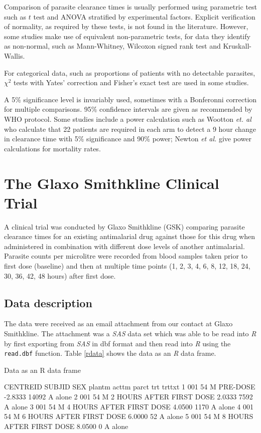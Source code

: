 Comparison of parasite clearance times is usually performed using parametric test such as $t$ test and ANOVA stratified by experimental factors\cite{vries, smithuis, wootton, carmello}. Explicit verification of normality, as required by these tests, is not found in the literature. However, some studies make use of equivalent non-parametric tests, for data they identify as non-normal, such as Mann-Whitney, Wilcoxon signed rank test\cite{carmello, newton} and Kruskall-Wallis\cite{pukri}.\label{stat-tests}

For categorical data, such as proportions of patients with no detectable parasites, $\chi^{2}$ tests with Yates' correction and Fisher's exact test are used in some studies\cite{newton, smithuis}.

A 5\% significance level is invariably used, sometimes with a Bonferonni correction for multiple comparisons. 95\% confidence intervals are given as recommended by WHO protocol\cite{protocolWHO}. Some studies include a power calculation such as Wootton \textit{et. al}\cite{wootton} who calculate that 22 patients are required in each arm to detect a 9 hour change in clearance time with 5\% significance and 90\% power; Newton \textit{et al.}\cite{newton} give power calculations for mortality rates.
\section{The Glaxo Smithkline Clinical Trial}
A clinical trial was conducted by Glaxo Smithkline (GSK) comparing parasite clearance times for an existing antimalarial drug against those for this drug when administered in combination with different dose levels of another antimalarial. Parasite counts per microlitre were recorded from blood samples taken prior to first dose (baseline) and then at multiple time points (1, 2, 3, 4, 6, 8, 12, 18, 24, 30, 36, 42, 48 hours) after first dose.

\subsection{Data description}
The data were received as an email attachment from our contact at Glaxo Smithkline. The attachment was a \emph{SAS} data set which was able to be read into \emph{R} by first exporting from \emph{SAS} in dbf format and then read into \emph{R} using the \texttt{read.dbf} function.
Table \ref{rdata} shows the data as an \emph{R} data frame. 
\begin{table}[h]
\caption{Data as an R data frame}\label{rdata}
\begin{boxedverbatim}
    CENTREID SUBJID SEX                    plantm   acttm  parct trt trttxt
1        001     54   M                  PRE-DOSE -2.8333  14092   A  alone
2        001     54   M  2 HOURS AFTER FIRST DOSE  2.0333   7592   A  alone
3        001     54   M  4 HOURS AFTER FIRST DOSE  4.0500   1170   A  alone
4        001     54   M  6 HOURS AFTER FIRST DOSE  6.0000     52   A  alone
5        001     54   M  8 HOURS AFTER FIRST DOSE  8.0500      0   A  alone
\end{boxedverbatim}
\end{table}

